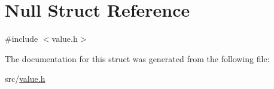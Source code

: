 \hypertarget{struct_null}{}\section{Null Struct Reference}
\label{struct_null}


{\ttfamily \#include $<$value.\+h$>$}



The documentation for this struct was generated from the following file\+:\begin{DoxyCompactItemize}
\item 
src/\hyperlink{value_8h}{value.\+h}\end{DoxyCompactItemize}
